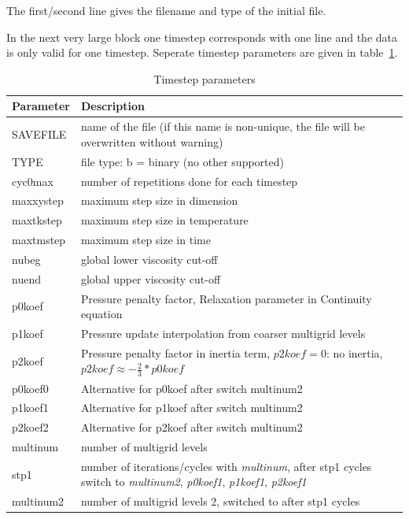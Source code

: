 The first/second line gives the filename and type of the initial file.

In the next very large block one timestep corresponds with one line and the data is only valid for one timestep. Seperate timestep parameters are given in table~\ref{tbl:timestep_parameters}.

\begin{table}[H]
	\small
	\centering
	\begin{tabular}{l p{13cm}}
		\toprule
		Parameter & Description \\
		\midrule
		SAVEFILE & name of the file (if this name is non-unique, the file will be overwritten without warning) \\
		TYPE & file type: b = binary (no other supported) \\
		cyc0max & number of repetitions done for each timestep \\
		maxxystep & maximum step size in dimension \\
		maxtkstep & maximum step size in temperature \\
		maxtmstep & maximum step size in time \\
		nubeg & global lower viscosity cut-off \\
		nuend & global upper viscosity cut-off \\
		p0koef & Pressure penalty factor, Relaxation parameter in Continuity equation \\
		p1koef & Pressure update interpolation from coarser multigrid levels \\
		p2koef & Pressure penalty factor in inertia term, $p2koef=0$: no inertia, $p2koef\approx-\frac{2}{3}*p0koef$\\
		p0koef0 & Alternative for p0koef after switch multinum2\\
		p1koef1 & Alternative for p1koef after switch multinum2\\
		p2koef2 & Alternative for p2koef after switch multinum2\\
		multinum &  number of multigrid levels \\
		stp1 & number of iterations/cycles with \textit{multinum}, after stp1 cycles switch to \textit{multinum2}, \textit{p0koef1}, \textit{p1koef1}, \textit{p2koef1}\\
		multinum2 & number of multigrid levels 2, switched to after stp1 cycles\\
		\bottomrule
	\end{tabular}
	\caption{Timestep parameters}
	\label{tbl:timestep_parameters}
\end{table}

